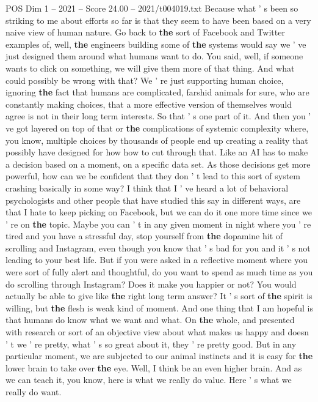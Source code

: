 \begin{textsample}{POS Dim 1 – 2021 – Score 24.00 – 2021/t004019.txt}
Because what ' s been so striking to me about efforts so far is that they seem to have been based on a very naive view of human nature.
Go back to \textbf{the} sort of Facebook and Twitter examples of, well, \textbf{the} engineers building some of \textbf{the} systems would say we ' ve just designed them around what humans want to do.
You said, well, if someone wants to click on something, we will give them more of that thing.
And what could possibly be wrong with that?
We ' re just supporting human choice, ignoring \textbf{the} fact that humans are complicated, farshid animals for sure, who are constantly making choices, that a more effective version of themselves would agree is not in their long term interests.
So that ' s one part of it.
And then you ' ve got layered on top of that or \textbf{the} complications of systemic complexity where, you know, multiple choices by thousands of people end up creating a reality that possibly have designed for how how to cut through that.
Like an AI has to make a decision based on a moment, on a specific data set.
As those decisions get more powerful, how can we be confident that they don ' t lead to this sort of system crashing basically in some way?
I think that I ' ve heard a lot of behavioral psychologists and other people that have studied this say in different ways, are that I hate to keep picking on Facebook, but we can do it one more time since we ' re on \textbf{the} topic.
Maybe you can ' t in any given moment in night where you ' re tired and you have a stressful day, stop yourself from \textbf{the} dopamine hit of scrolling and Instagram, even though you know that ' s bad for you and it ' s not leading to your best life.
But if you were asked in a reflective moment where you were sort of fully alert and thoughtful, do you want to spend as much time as you do scrolling through Instagram?
Does it make you happier or not?
You would actually be able to give like \textbf{the} right long term answer?
It ' s sort of \textbf{the} spirit is willing, but \textbf{the} flesh is weak kind of moment.
And one thing that I am hopeful is that humans do know what we want and what.
On \textbf{the} whole, and presented with research or sort of an objective view about what makes us happy and doesn ' t we ' re pretty, what ' s so great about it, they ' re pretty good.
But in any particular moment, we are subjected to our animal instincts and it is easy for \textbf{the} lower brain to take over \textbf{the} eye.
Well, I think be an even higher brain.
And as we can teach it, you know, here is what we really do value.
Here ' s what we really do want.

\end{textsample}

